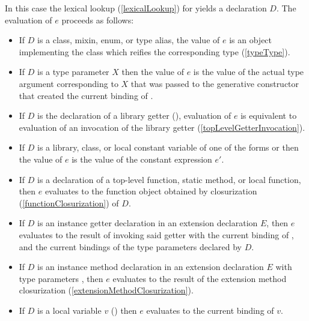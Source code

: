 \documentclass[makeidx]{article}
\begin{document}
\LMHash{}%
In this case the lexical lookup
(\ref{lexicalLookup})
for \id{} yields a declaration $D$.
The evaluation of $e$ proceeds as follows:

\begin{itemize}
\item
  If $D$ is a class, mixin, enum, or type alias,
  the value of $e$ is an object implementing the class 
  which reifies the corresponding type
  (\ref{typeType}).
\item
  If $D$ is a type parameter $X$ then the value of $e$ is
  the value of the actual type argument corresponding to $X$
  that was passed to the generative constructor that created
  the current binding of \THIS.
\item
  If $D$ is the declaration of a library getter
  (),
  evaluation of $e$ is equivalent to evaluation of an invocation of
  the library getter \id{}
  (\ref{topLevelGetterInvocation}).
\item
  If $D$ is a library, class, or local constant variable of one of the forms
   or 
  then the value of $e$ is the value of the constant expression $e'$.
\item
  If $D$ is a declaration of
  a top-level function, static method, or local function,
  then $e$ evaluates to the function object obtained by closurization
  (\ref{functionClosurization})
  of $D$.
\item
  If $D$ is an instance getter declaration in an extension declaration $E$,
  then $e$ evaluates to the result of invoking said getter
  with the current binding of \THIS, and
  the current bindings of the type parameters declared by $D$.
\item
  If $D$ is an instance method declaration in an extension declaration $E$
  with type parameters ,
  then $e$ evaluates to the result of the extension method closurization
  (\ref{extensionMethodClosurization}).
\item
  If $D$ is a local variable $v$
  ()
  then $e$ evaluates to the current binding of $v$.
\end{itemize}
\end{document}
